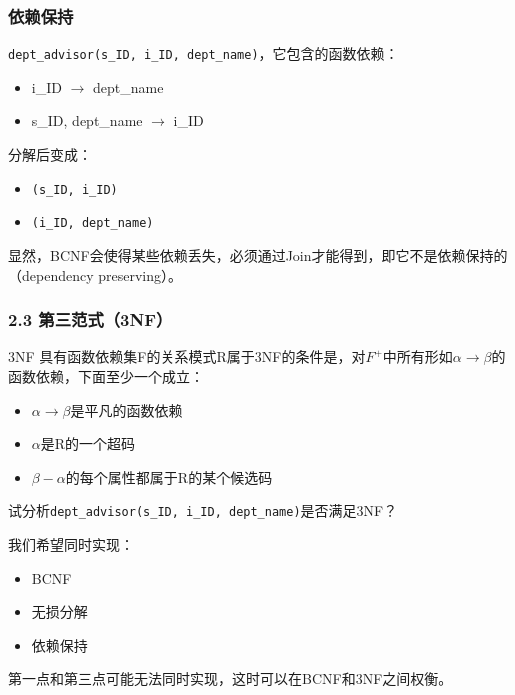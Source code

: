 \documentclass[aspectratio=169, 14pt]{beamer}
\begin{document}
\begin{frame}
	\frametitle{依赖保持}
	\texttt{dept\_advisor(s\_ID, i\_ID, dept\_name)}，它包含的函数依赖：

	\begin{itemize}
		\item i\_ID $\rightarrow$ dept\_name
		\item s\_ID, dept\_name $\rightarrow$ i\_ID
	\end{itemize}

	分解后变成：

	\begin{itemize}
		\item \texttt{(s\_ID, i\_ID)}
		\item \texttt{(i\_ID, dept\_name)}
	\end{itemize}

	显然，BCNF会使得某些依赖丢失，必须通过Join才能得到，即它不是\alert{依赖保持}的（dependency preserving）。
\end{frame}


\begin{frame}
	\frametitle{2.3 第三范式（3NF）}
	\begin{exampleblock}{3NF}
		具有函数依赖集F的关系模式R属于3NF的条件是，对$F^+$中所有形如$\alpha \rightarrow \beta$的函数依赖，下面至少一个成立：
		\begin{itemize}
			\item $\alpha \rightarrow \beta$是平凡的函数依赖
			\item $\alpha$是R的一个超码
			\item $\beta - \alpha$的每个属性都属于R的某个候选码
		\end{itemize}
	\end{exampleblock}
	 试分析\texttt{dept\_advisor(s\_ID, i\_ID, dept\_name)}是否满足3NF？
\end{frame}

{
\begin{frame}[standout]
	我们希望同时实现：

	\begin{itemize}
		\item BCNF
		\item 无损分解
		\item 依赖保持
	\end{itemize}

	{\small 第一点和第三点可能无法同时实现，这时可以在BCNF和3NF之间权衡。}
\end{frame}
}
\end{document}
